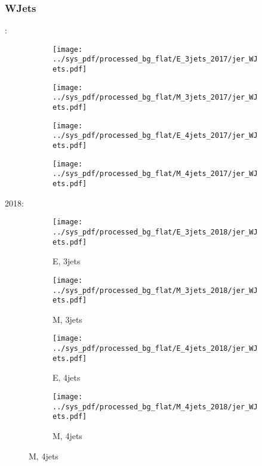 \documentclass{beamer}
\begin{document}
\begin{frame}
\frametitle{WJets}
\fontsize{5}{1}:
\begin{figure}
\centering
\begin{subfigure}[b]{0.24\textwidth}
\texttt{[image: ../sys\_pdf/processed\_bg\_flat/E\_3jets\_2017/jer\_WJets.pdf]}
\end{subfigure}
\begin{subfigure}[b]{0.24\textwidth}
\texttt{[image: ../sys\_pdf/processed\_bg\_flat/M\_3jets\_2017/jer\_WJets.pdf]}
\end{subfigure}
\begin{subfigure}[b]{0.24\textwidth}
\texttt{[image: ../sys\_pdf/processed\_bg\_flat/E\_4jets\_2017/jer\_WJets.pdf]}
\end{subfigure}
\begin{subfigure}[b]{0.24\textwidth}
\texttt{[image: ../sys\_pdf/processed\_bg\_flat/M\_4jets\_2017/jer\_WJets.pdf]}
\end{subfigure}
\end{figure}
2018:
\begin{figure}
\centering
\begin{subfigure}[b]{0.24\textwidth}
\texttt{[image: ../sys\_pdf/processed\_bg\_flat/E\_3jets\_2018/jer\_WJets.pdf]}
\captionsetup{font=tiny}
\caption{E, 3jets}
\end{subfigure}
\begin{subfigure}[b]{0.24\textwidth}
\texttt{[image: ../sys\_pdf/processed\_bg\_flat/M\_3jets\_2018/jer\_WJets.pdf]}
\captionsetup{font=tiny}
\caption{M, 3jets}
\end{subfigure}
\begin{subfigure}[b]{0.24\textwidth}
\texttt{[image: ../sys\_pdf/processed\_bg\_flat/E\_4jets\_2018/jer\_WJets.pdf]}
\captionsetup{font=tiny}
\caption{E, 4jets}
\end{subfigure}
\begin{subfigure}[b]{0.24\textwidth}
\texttt{[image: ../sys\_pdf/processed\_bg\_flat/M\_4jets\_2018/jer\_WJets.pdf]}
\captionsetup{font=tiny}
\caption{M, 4jets}
\end{subfigure}
\end{figure}
\end{frame}
\end{document}
